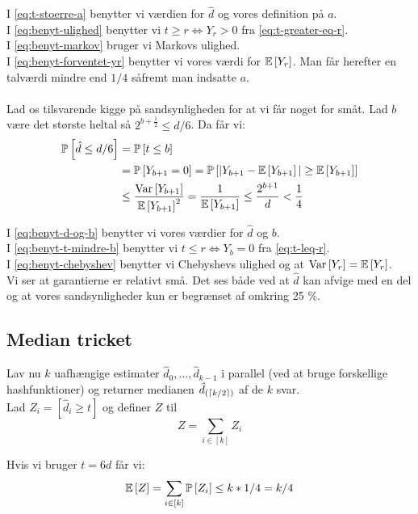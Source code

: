 I \cref{eq:t-stoerre-a} benytter vi værdien for $\hat d$ og vores definition på $a$.\\
I \cref{eq:benyt-ulighed} benytter vi $t \geq r \Longleftrightarrow Y_r > 0$ fra \cref{eq:t-greater-eq-r}.\\
I \cref{eq:benyt-markov} bruger vi Markovs ulighed.\\
I \cref{eq:benyt-forventet-yr} benytter vi vores værdi for $\mathbb{E} \left[  Y_r  \right]$. Man får herefter en talværdi mindre end $1/4$ såfremt man indsatte $a$.\\\\

Lad os tilsvarende kigge på sandsynligheden for at vi får noget for småt. Lad $b$ være det største heltal så $2^{b + \frac{1}{2}} \leq d/6$. Da får vi:
\begin{align}
  \mathbb{P} \left[  \hat d \leq d/6  \right]
  &= \mathbb{P} \left[  t \leq b  \right] \label{eq:benyt-d-og-b} \\
  &= \mathbb{P} \left[  Y_{b+1} = 0  \right]
  = \mathbb{P} \left[   |Y_{b+1} - \mathbb{E} \left[  Y_{b+1}  \right]| \geq \mathbb{E} \left[  Y_{b+1}  \right]   \right] \label{eq:benyt-t-mindre-b} \\
  &\leq \frac{\text{Var} \left[  Y_{b+1}  \right]}{ \mathbb{E} \left[  Y_{b+1}  \right]^2 }
  = \frac{1}{\mathbb{E} \left[  Y_{b+1}  \right]}
  \leq \frac{2^{b+1}}{d} \label{eq:benyt-chebyshev}
  < \frac{1}{4}
\end{align}

I \cref{eq:benyt-d-og-b} benytter vi vores værdier for $\hat d$ og $b$.\\
I \cref{eq:benyt-t-mindre-b} benytter vi $t \leq r \Longleftrightarrow Y_b = 0$ fra \cref{eq:t-leq-r}.\\
I \cref{eq:benyt-chebyshev} benytter vi Chebyshevs ulighed og at $\text{Var} \left[  Y_r  \right] = \mathbb{E} \left[  Y_r  \right]$.\\

Vi ser at garantierne er relativt små. Det ses både ved at $\hat d$ kan afvige med en del og at vores sandsynligheder kun er begrænset af omkring 25 \%.

\subsection{Median tricket}
Lav nu $k$ uafhængige estimater $\hat d_0, \dots, \hat d_{k-1}$ i parallel (ved at bruge forskellige hashfunktioner) og returner medianen $\hat d_{(\left\lceil k/2 \right\rceil)}$ af de $k$ svar.\\


Lad $Z_i = [\hat d_i \geq t]$ og definer $Z$ til
$$
Z = \sum_{i \in [k]} Z_i
$$

Hvis vi bruger $t = 6d$ får vi:
$$
  \mathbb{E} \left[  Z  \right] = \sum_{i \in [k]} \mathbb{P} \left[  Z_i  \right] \leq k * 1/4 = k/4
$$

